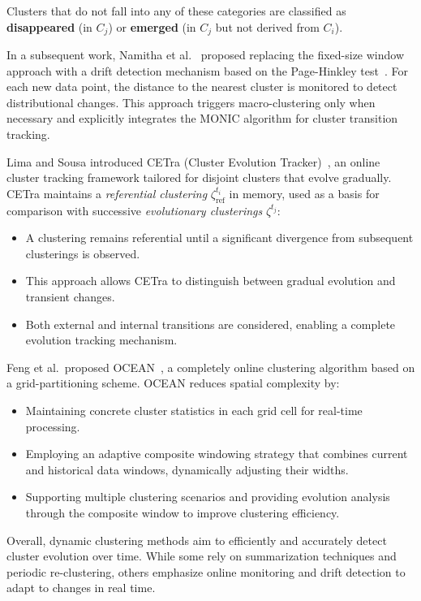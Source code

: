 Clusters that do not fall into any of these categories are classified as
\textbf{disappeared} (in $C_j$) or \textbf{emerged} (in $C_j$ but not derived
from $C_i$).

In a subsequent work, Namitha et al.~\cite{namitha_dynamic_clustering_2}
proposed replacing the fixed-size window approach with a drift detection
mechanism based on the Page-Hinkley test~\cite{page_hinkley}. For each new data
point, the distance to the nearest cluster is monitored to detect
distributional changes. This approach triggers macro-clustering only when
necessary and explicitly integrates the MONIC algorithm for cluster transition
tracking.

Lima and Sousa introduced CETra (Cluster Evolution Tracker)~\cite{cetra}, an
online cluster tracking framework tailored for disjoint clusters that evolve
gradually. CETra maintains a \textit{referential clustering}
$\zeta_{\text{ref}}^{t_i}$ in memory, used as a basis for comparison with
successive \textit{evolutionary clusterings} $\zeta^{t_j}$:

\begin{itemize}
    \item A clustering remains referential until a significant divergence from subsequent
          clusterings is observed.
    \item This approach allows CETra to distinguish between gradual evolution and
          transient changes.
    \item Both external and internal transitions are considered, enabling a complete
          evolution tracking mechanism.
\end{itemize}

Feng et al.\ proposed OCEAN~\cite{ocean}, a completely online clustering
algorithm based on a grid-partitioning scheme. OCEAN reduces spatial complexity
by:

\begin{itemize}
    \item Maintaining concrete cluster statistics in each grid cell for real-time
          processing.
    \item Employing an adaptive composite windowing strategy that combines current and
          historical data windows, dynamically adjusting their widths.
    \item Supporting multiple clustering scenarios and providing evolution analysis
          through the composite window to improve clustering efficiency.
\end{itemize}

Overall, dynamic clustering methods aim to efficiently and accurately detect
cluster evolution over time. While some rely on summarization techniques and
periodic re-clustering, others emphasize online monitoring and drift detection
to adapt to changes in real time.